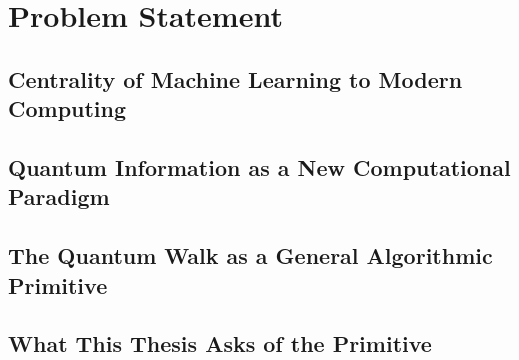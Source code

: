 \section{Problem Statement}
\label{sec:problem}
%
\subsection{Centrality of Machine Learning to Modern Computing}
\subsection{Quantum Information as a New Computational Paradigm}
\subsection{The Quantum Walk as a General Algorithmic Primitive}
\subsection{What This Thesis Asks of the Primitive}


